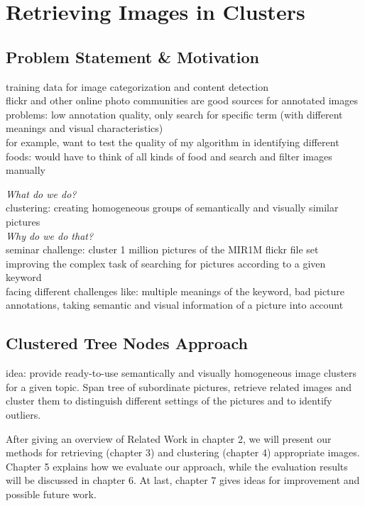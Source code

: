 \section{Retrieving Images in Clusters}
\label{sec_introduction}


\subsection{Problem Statement \& Motivation}
training data for image categorization and content detection \\
flickr and other online photo communities are good sources for annotated images \\
problems: low annotation quality, only search for specific term (with different meanings and visual characteristics) \\
for example, want to test the quality of my algorithm in identifying different foods: would have to think of all kinds of food and search and filter images manually

\bigskip

\emph{What do we do?} \\
clustering: creating homogeneous groups of semantically and visually similar pictures \\

\emph{Why do we do that?} \\
seminar challenge: cluster 1 million pictures of the MIR1M flickr file set \\
improving the complex task of searching for pictures according to a given keyword \\
facing different challenges like: multiple meanings of the keyword, bad picture annotations, taking semantic and visual information of a picture into account \\

\subsection{Clustered Tree Nodes Approach}
idea: provide ready-to-use semantically and visually homogeneous image clusters for a given topic. Span tree of subordinate pictures, retrieve related images and cluster them to distinguish different settings of the pictures and to identify outliers.

\bigskip

After giving an overview of Related Work in chapter 2, we will present our methods for retrieving (chapter 3) and clustering (chapter 4) appropriate images. Chapter 5 explains how we evaluate our approach, while the evaluation results will be discussed in chapter 6. At last, chapter 7 gives ideas for improvement and possible future work.
